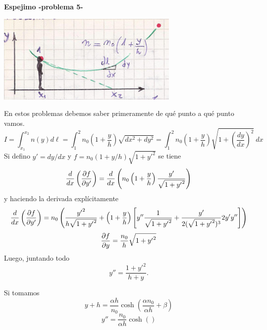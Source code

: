 \documentclass[10pt,oneside]{CBFT_book}
\begin{document}
\begin{ejemplo}{\bf Espejimo -problema 5-}
 
\includegraphics[scale=0.3]{images/fig_mc_espejismo.jpg}

En estos problemas debemos saber primeramente de qué punto a qué punto vamos.
\[
	I = \int_{x_1}^{x_2} n(y) d\ell = \int_1^2 n_0 \left( 1 + \frac y h \right) \sqrt{ dx^2 + dy^2} =
	\int_1^2 n_0 \left( 1 + \frac y h \right) \sqrt{ 1 + \left( \frac{dy}{dx} \right)^2 } \: dx
\]
Si defino $ y' = dy/dx$ y $f = n_0 (1 + y/h) \sqrt{ 1 + {y'}^2}$ se tiene 
\[
	\frac{d^{\hspace{-0.05em}} {}}{d {x}^{\hspace{-0.05em}}}\left( \frac{\partial^{\hspace{-0.05em}} {f}}{\partial {y'}^{\hspace{-0.05em}}}\right) = \frac{d^{\hspace{-0.05em}} {}}{d {x}^{\hspace{-0.05em}}} \left( n_0 \left( 1 + \frac y h \right) 
	\frac{y'}{\sqrt{ 1 + {y'}^2}} \right)
\]
y haciendo la derivada explícitamente
\[
	\frac{d^{\hspace{-0.05em}} {}}{d {x}^{\hspace{-0.05em}}}\left( \frac{\partial^{\hspace{-0.05em}} {f}}{\partial {y'}^{\hspace{-0.05em}}}\right) = n_0 \left( 
	\frac{ {y'}^2}{h\sqrt{1 + {y'}^2} } + \left( 1 + \frac y h \right) 
	\left[ y''\frac{1}{\sqrt{1 + {y'}^2}} + \frac{y'}{2 (\sqrt{1 + {y'}^2})^3 } 2 y' y'' \right]
	\right)
\]
\[
	\frac{\partial^{\hspace{-0.05em}} {f}}{\partial {y}^{\hspace{-0.05em}}} = \frac {n_0}{h}  \sqrt{ 1 + { y'}^2 } 
\]
Luego, juntando todo
\[
	y'' = \frac{1 + y'^2}{h+y}.
\]

Si tomamos 
\[
	y + h = \frac{\alpha h}{n_0} \cosh \left( \frac{\alpha n_0}{\alpha h}+ \beta \right)
\]
\[
	y'' = \frac{n_0}{\alpha h} \cosh ()
\]
\end{ejemplo}
\end{document}

